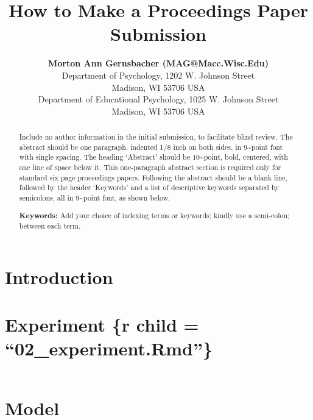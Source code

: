 \documentclass[10pt, letterpaper]{article}
\title{How to Make a Proceedings Paper Submission}
\author{{\large \bf Morton Ann Gernsbacher (MAG@Macc.Wisc.Edu)} \\ Department of Psychology, 1202 W. Johnson Street \\ Madison, WI 53706 USA \AND {\large \bf Sharon J.~Derry (SDJ@Macc.Wisc.Edu)} \\ Department of Educational Psychology, 1025 W. Johnson Street \\ Madison, WI 53706 USA}
\begin{document}
\maketitle

\begin{abstract}
Include no author information in the initial submission, to facilitate
blind review. The abstract should be one paragraph, indented 1/8 inch on
both sides, in 9\textasciitilde point font with single spacing. The
heading `Abstract' should be 10\textasciitilde point, bold, centered,
with one line of space below it. This one-paragraph abstract section is
required only for standard six page proceedings papers. Following the
abstract should be a blank line, followed by the header `Keywords' and a
list of descriptive keywords separated by semicolons, all in
9\textasciitilde point font, as shown below.

\textbf{Keywords:}
Add your choice of indexing terms or keywords; kindly use a semi-colon;
between each term.
\end{abstract}

\hypertarget{introduction}{%
\section{Introduction}\label{introduction}}

\hypertarget{experiment-r-child-02_experiment.rmd}{%
\section{Experiment \{r child =
``02\_experiment.Rmd''\}}\label{experiment-r-child-02_experiment.rmd}}

\begin{verbatim}
\end{verbatim}

\hypertarget{model}{%
\section{Model}\label{model}}
\end{document}
